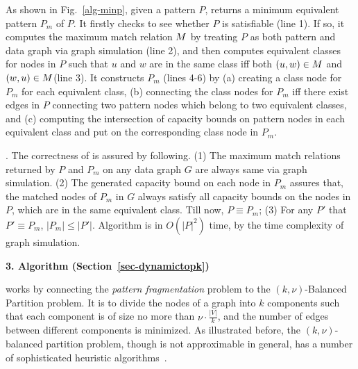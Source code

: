 {As shown in Fig.~\ref{alg-minp}, given a pattern $P$, \minp returns a minimum equivalent pattern $P_m$ of $P$.
It firstly checks to see whether $P$ is satisfiable (line 1).
If so, it computes the maximum match relation $M$ by treating $P$ as both pattern and data graph via graph simulation (line 2),
and then computes equivalent classes for nodes in $P$ such that $u$ and $w$ are in the same class iff both $(u, w)\in M$ and $(w, u)\in M$(line 3).
It constructs $P_m$ (lines 4-6) by
(a) creating a class node for $P_m$ for each equivalent class,
(b) connecting the class nodes for $P_m$ iff there exist edges in $P$ connecting two pattern nodes which belong to two equivalent classes, and
(c) computing the intersection of capacity bounds on pattern nodes in each equivalent class and put on the corresponding class node in $P_m$.

\vspace{-2ex}
. The correctness of \minp is assured by following.
(1) The maximum match relations returned by $P$ and $P_{m}$ on any data graph $G$ are always same via graph simulation.
(2) The generated capacity bound on each node in $P_{m}$ assures that, the matched nodes of $P_{m}$ in $G$ always satisfy all capacity bounds on the nodes in $P$, which are in the same equivalent class.
Till now, $P\equiv P_{m}$;
(3) For any $P'$ that $P'\equiv P_{m}$, $|P_{m}|\leq|P'|$.
Algorithm \minp is in $O(|P|^2)$ time, by the time complexity of graph simulation.
}%

\noindent
{\textbf{3. Algorithm  (Section~\ref{sec-dynamictopk})}}

 works by connecting the {\em pattern fragmentation} problem to the
{\sc $(k, \nu)$-Balanced Partition} problem.
It is to divide the nodes of a graph into $k$ components such that each component is of size no more than $\nu\cdot\frac{|V|}{k}$, and the number of edges between different components is minimized.
As illustrated before, the $(k,\nu)$-balanced partition problem,
though is not approximable in general, has a number of sophisticated heuristic algorithms~\cite{AndreevR06}.

